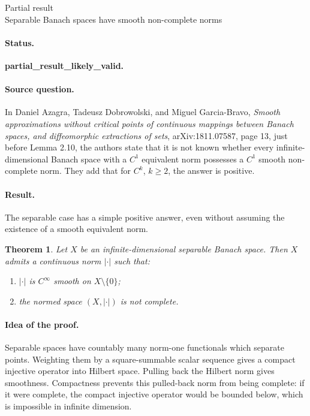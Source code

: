 \documentclass[11pt]{article}
\newtheorem{theorem}{Theorem}
\begin{document}
\begin{center}
{\Large Partial result}\\[3pt]
{\large Separable Banach spaces have smooth non-complete norms}
\end{center}

\paragraph{Status.}
\textbf{partial\_result\_likely\_valid.}

\paragraph{Source question.}
In Daniel Azagra, Tadeusz Dobrowolski, and Miguel Garcia-Bravo,
\emph{Smooth approximations without critical points of continuous mappings
between Banach spaces, and diffeomorphic extractions of sets},
arXiv:1811.07587, page 13, just before Lemma 2.10, the authors state that
it is not known whether every infinite-dimensional Banach space with a
\(C^1\) equivalent norm possesses a \(C^1\) smooth non-complete norm.  They
add that for \(C^k\), \(k\ge2\), the answer is positive.

\paragraph{Result.}
The separable case has a simple positive answer, even without assuming the
existence of a smooth equivalent norm.

\begin{theorem}
Let \(X\) be an infinite-dimensional separable Banach space.  Then \(X\)
admits a continuous norm \(|\cdot|\) such that:
\begin{enumerate}
\item \(|\cdot|\) is \(C^\infty\) smooth on \(X\setminus\{0\}\);
\item the normed space \((X,|\cdot|)\) is not complete.
\end{enumerate}
\end{theorem}

\paragraph{Idea of the proof.}
Separable spaces have countably many norm-one functionals which separate
points.  Weighting them by a square-summable scalar sequence gives a compact
injective operator into Hilbert space.  Pulling back the Hilbert norm gives
smoothness.  Compactness prevents this pulled-back norm from being complete:
if it were complete, the compact injective operator would be bounded below,
which is impossible in infinite dimension.
\end{document}
